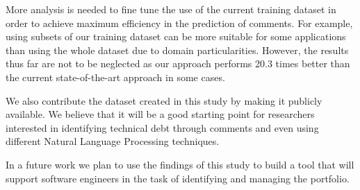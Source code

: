 More analysis is needed to fine tune the use of the current training dataset in order to achieve maximum efficiency in the prediction of \SATD comments. For example, using subsets of our training dataset can be more suitable for some applications than using the whole dataset due to domain particularities. However, the results thus far are not to be neglected as our approach performs 20.3 times   better than the current state-of-the-art approach in some cases.

We also contribute the dataset created in this study by making it publicly available. We believe that it will be a good starting point for researchers interested in identifying technical debt through comments and even using different Natural Language Processing techniques. 

In a future work we plan to use the findings of this study to build a tool that will support software engineers in the task of identifying and managing the \SATD portfolio. 

